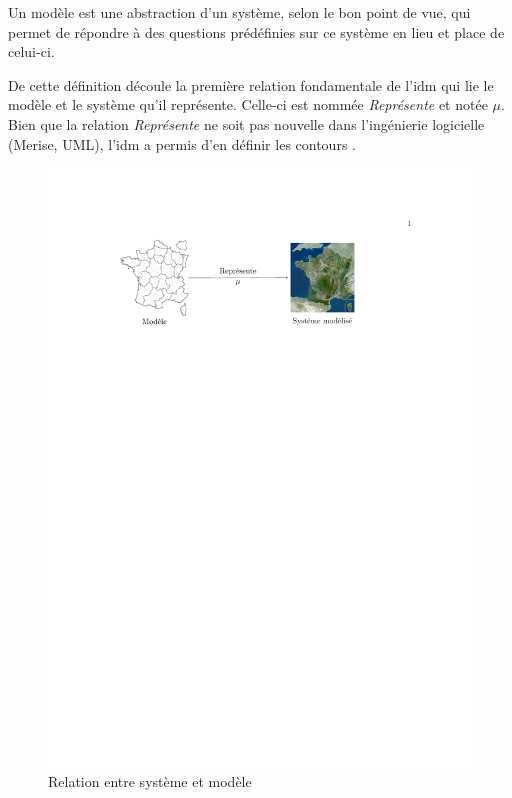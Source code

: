 \begin{definition}
Un modèle est une abstraction d'un système, selon le bon point de vue, qui 
permet de répondre à des questions prédéfinies sur ce système en lieu et place 
de celui-ci.
\end{definition}

De cette définition découle la première relation fondamentale de l'\gls{idm} qui lie 
le modèle et le système qu'il représente. Celle-ci est nommée 
\textit{Représente} et notée $\mu$. Bien que la relation 
\textit{Représente} ne soit pas nouvelle dans l'ingénierie logicielle 
(Merise, UML), l'\gls{idm} a permis d'en définir les contours \cite{atkinson2003model} 
\cite{seidewitz2003models} \cite{bezivin2004search}.

\begin{figure}[!ht]
    \includegraphics[trim= 100 635 400 100]{figures/3_etat_de_l_art_IDM/modele_france.pdf} %
    \caption{Relation entre système et modèle \protect\cite{favre2006ingenierie}}
    \label{fig:systemModele}
\end{figure}

